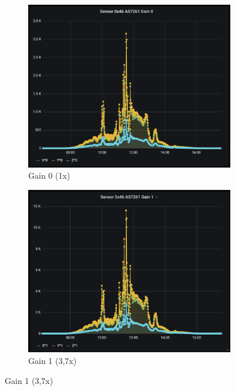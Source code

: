 \begin{figure}[H]
  \begin{subfigure}[b]{0.5\textwidth}
    \includegraphics[width=\textwidth]{img/Grafana-Gain0}
    \caption{Gain 0 (1x)}
	\label{fig:Grafana_Gain0}
  \end{subfigure}
  \begin{subfigure}[b]{0.5\textwidth}
    \includegraphics[width=\textwidth]{img/Grafana-Gain1}
    \caption{Gain 1 (3,7x)}
      \label{fig:Grafana_Gain1}
  \end{subfigure}
\end{figure}

